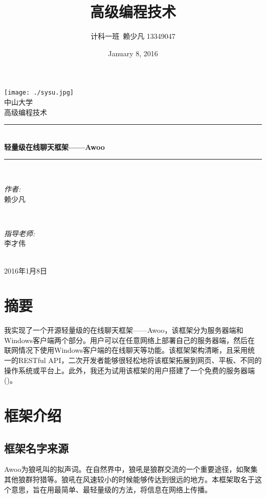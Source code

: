 \documentclass[a4paper,11pt]{article}
\title{高级编程技术}
\author{计科一班~赖少凡 13349047}
\date{January 8, 2016}
\begin{document}
\begin{titlepage}
	\newcommand{\HRule}{\rule{\linewidth}{0.5mm}}
	\center
	
	\texttt{[image: ./sysu.jpg]}~\\[1cm]
	\textsc{\LARGE 中山大学}\\[1.5cm]
	\textsc{\Large 高级编程技术}\\[0.5cm]
	
	\HRule \\[0.8cm]
	{ \huge \bfseries 轻量级在线聊天框架——Awoo}\\[0.4cm]
	\HRule \\[1.5cm]
	
	\begin{minipage}{0.4\textwidth}
		\begin{flushleft} \large
			\emph{作者:}\\
			赖少凡
		\end{flushleft}
	\end{minipage}
	~
	\begin{minipage}{0.4\textwidth}
		\begin{flushright} \large
		\emph{指导老师:} \\
			李才伟
		\end{flushright}
	\end{minipage}\\[4cm]


	{\large 2016年1月8日}\\[3cm]

	\end{titlepage}

\tableofcontents

\section*{摘要}
    我实现了一个开源轻量级的在线聊天框架——Awoo，该框架分为服务器端和Windows客户端两个部分。用户可以在任意网络上部署自己的服务器端，然后在联网情况下使用Windows客户端的在线聊天等功能。该框架架构清晰，且采用统一的RESTful API，二次开发者能够很轻松地将该框架拓展到网页、平板、不同的操作系统或平台上。此外，我还为试用该框架的用户搭建了一个免费的服务器端(\cite{1})。

\section{框架介绍}
    \subsection{框架名字来源}
        Awoo为狼吼叫的拟声词。在自然界中，狼吼是狼群交流的一个重要途径\textsuperscript{\cite{2}}，如聚集其他狼群狩猎等。狼吼在风速较小的时候能够传达到很远的地方。本框架取名于这个意思，旨在用最简单、最轻量级的方法，将信息在网络上传播。
\end{document}
